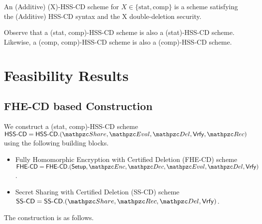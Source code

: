 \begin{definition} An (Additive)
(X)-HSS-CD scheme for $X \in \{\textrm{stat}, \textrm{comp}\}$ is a
scheme satisfying the (Additive) HSS-CD syntax and the X
double-deletion security.
\end{definition}

\begin{remark}
Observe that a (stat, comp)-HSS-CD scheme is also a (stat)-HSS-CD
scheme. Likewise, a (comp, comp)-HSS-CD scheme is also a
(comp)-HSS-CD scheme.
\end{remark}

\section{Feasibility Results}

\subsection{FHE-CD based Construction}

We construct a (stat, comp)-HSS-CD scheme
$\HSScd = \HSScd.(\Sh, \Ev, \Del, \Vrfy, \Rec)$ using the following
building blocks.

\begin{itemize}
\item Fully Homomorphic Encryption with Certified Deletion (FHE-CD)
scheme $\FHEcd = \FHEcd.(\Setup, \qEnc, \qDec, \\
\Ev, \Del, \Vrfy)$.

\item Secret Sharing with Certified Deletion (SS-CD) scheme $\SScd =
\SScd.(\Sh, \Rec, \Del, \Vrfy)$.
\end{itemize}

The construction is as follows.\\ \\

